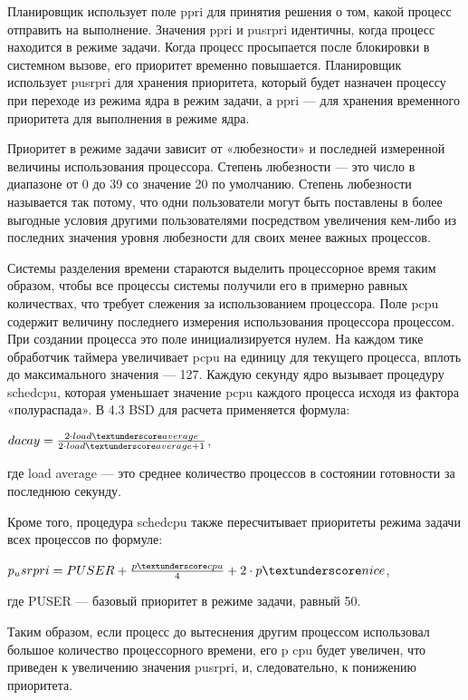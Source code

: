 \documentclass[12pt]{report}
\begin{document}
Планировщик использует поле p\textunderscore pri для принятия решения о том, какой процесс отправить на выполнение. Значения p\textunderscore pri и p\textunderscore usrpri идентичны, когда процесс находится в режиме задачи. Когда процесс просыпается после блокировки в системном вызове, его приоритет временно повышается. Планировщик использует p\textunderscore usrpri для хранения приоритета, который будет назначен процессу при переходе из режима ядра в режим задачи, а p\textunderscore pri — для хранения временного приоритета для выполнения в режиме ядра.

Приоритет в режиме задачи зависит от «любезности» и последней измеренной величины использования процессора. Степень любезности
—	это число в диапазоне от 0 до 39 со значение 20 по умолчанию. Степень любезности называется так потому, что одни пользователи могут быть поставлены в более выгодные условия другими пользователями посредством увеличения кем-либо из последних значения уровня любезности для своих менее важных процессов.

Системы разделения времени стараются выделить процессорное время таким образом, чтобы все процессы системы получили его в примерно равных количествах, что требует слежения за использованием процессора. Поле p\textunderscore cpu содержит величину последнего измерения использования процессора процессом. При создании процесса это поле инициализируется нулем. На каждом тике обработчик таймера увеличивает p\textunderscore cpu на единицу для текущего процесса, вплоть до максимального значения — 127. Каждую секунду ядро вызывает процедуру schedcpu, которая уменьшает значение p\textunderscore cpu каждого процесса исходя из фактора «полураспада». В 4.3 BSD для расчета применяется формула:

\begin{center}
	$dacay = \frac{2 \cdot load\textunderscore average}{2 \cdot load\textunderscore average +1 }$,
\end{center}
где load \textunderscore average — это среднее количество процессов в состоянии готовности за последнюю секунду.

Кроме того, процедура schedcpu также пересчитывает приоритеты режима задачи всех процессов по формуле:
\begin{center}
	$p_{u}srpri = PUSER + \frac{p \textunderscore cpu}{4} + 2
	\cdot p \textunderscore nice$,
\end{center}
где PUSER — базовый приоритет в режиме задачи, равный 50.

Таким образом, если процесс до вытеснения другим процессом использовал большое количество процессорного времени, его p \textunderscore cpu будет увеличен, что приведен к увеличению значения p\textunderscore usrpri, и, следовательно, к понижению приоритета.
\end{document}
